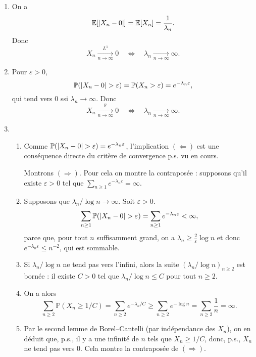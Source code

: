 \documentclass[a4paper,11pt]{article}
\let\originalleft\left
\let\originalright\right
\renewcommand{\left}{\mathopen{}\mathclose\bgroup\originalleft}
\renewcommand{\right}{\aftergroup\egroup\originalright}
\renewcommand{\P}{\mathbb{P}}
\newcommand{\1}{\mathbbm{1}}
\newcommand{\Ec}[1]{\mathbb{E} \left[#1\right]}
\newcommand{\Pp}[1]{\mathbb{P} \left(#1\right)}
\newcommand{\abs}[1]{\left\lvert#1\right\rvert}
\theoremstyle{plain}
\theoremstyle{definition}
\begin{document}
\begin{enumerate}
	\item On a
	\[
	\Ec{\abs{X_n-0}} = \Ec{X_n} = \frac{1}{\lambda_n}.
	\]
	Donc
	\[
		X_n \xrightarrow[n\to\infty]{L^1} 0 
		\quad \Leftrightarrow \quad
		\lambda_n \xrightarrow[n\to\infty]{} \infty.
	\]
	\item Pour $\varepsilon > 0$,
	\[
	\Pp{\abs{X_n-0} > \varepsilon} = \P(X_n> \varepsilon) = e^{-\lambda_n \varepsilon},
	\]
	qui tend vers 0 ssi $\lambda_n \to \infty$. Donc
	\[
	X_n \xrightarrow[n\to\infty]{\P} 0 
	\quad \Leftrightarrow \quad
	\lambda_n \xrightarrow[n\to\infty]{} \infty.
	\]
	\item
	\begin{enumerate}
        \item Comme $\Pp{\abs{X_n-0} > \varepsilon} = e^{-\lambda_n \varepsilon}$, l'implication $(\Leftarrow)$ est une conséquence directe du critère de convergence p.s. vu en cours.

        Montrons $(\Rightarrow)$. Pour cela on montre la contraposée : supposons qu'il existe $\varepsilon > 0$ tel que $\sum_{n\geq 1} e^{-\lambda_n \varepsilon} = \infty$.
		\item Supposons que $\lambda_n/\log n \to \infty$.
		Soit $\varepsilon > 0$.
		\[
		\sum_{n\geq 1} \Pp{\abs{X_n-0} > \varepsilon} 
		= \sum_{n\geq 1} e^{-\lambda_n \varepsilon} < \infty,
		\]
		parce que, pour tout $n$ suffisamment grand, on a $\lambda_n \geq \frac{2}{\varepsilon} \log n$ et donc $e^{-\lambda_n \varepsilon} \leq n^{-2}$, qui est sommable. 
		\item Si $\lambda_n/\log n$ ne tend pas vers l'infini, alors la suite $(\lambda_n/\log n)_{n\geq 2}$ est bornée : il existe $C>0$ tel que $\lambda_n/\log n \leq C$ pour tout $n \geq 2$.
		\item On a alors
		\[
		\sum_{n\geq 2} \P(X_n \geq 1/C) 
		= \sum_{n\geq 2} e^{-\lambda_n/C} 
		\geq \sum_{n\geq 2} e^{-\log n}
		= \sum_{n\geq 2} \frac{1}{n}
		= \infty.
		\]
		\item Par le second lemme de Borel--Cantelli (par indépendance des $X_n$), on en déduit que, p.s., il y a une infinité de $n$ tels que $X_n \geq 1/C$, donc, p.s., $X_n$ ne tend pas vers 0. 
		Cela montre la contraposée de $(\Rightarrow)$. 
	\end{enumerate}
\end{enumerate}
\begin{comment}
\end{comment}
\end{document}
